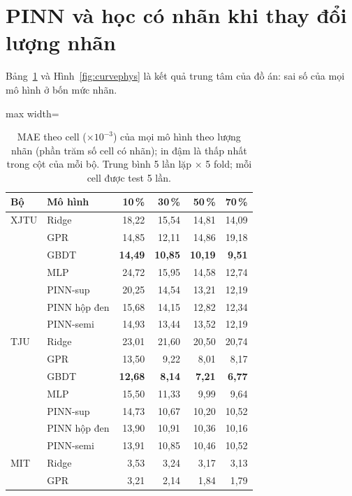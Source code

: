 \documentclass[12pt,a4paper,oneside]{report}
\theoremstyle{plain}
\theoremstyle{definition}
\begin{document}
\section{PINN và học có nhãn khi thay đổi lượng nhãn}\label{sec:labels}

Bảng~\ref{tab:big} và Hình~\ref{fig:curvephys} là kết quả trung tâm của đồ án: sai số của
mọi mô hình ở bốn mức nhãn.

\begin{table}[!htbp]\centering\small
\caption[MAE theo cell của mọi mô hình theo lượng nhãn]{MAE theo cell (×$10^{-3}$) của mọi mô hình theo lượng nhãn (phần trăm số cell có nhãn); in đậm là thấp nhất trong cột của mỗi bộ. Trung bình 5 lần lặp × 5 fold; mỗi cell được test 5 lần.}\label{tab:big}
\begin{adjustbox}{max width=\textwidth}\begin{tabular}{llrrrr}\toprule
Bộ & Mô hình & 10\,\% & 30\,\% & 50\,\% & 70\,\% \\\midrule
XJTU & Ridge & 18{,}22 & 15{,}54 & 14{,}81 & 14{,}09 \\
 & GPR & 14{,}85 & 12{,}11 & 14{,}86 & 19{,}18 \\
 & GBDT & \textbf{14{,}49} & \textbf{10{,}85} & \textbf{10{,}19} & \textbf{9{,}51} \\
 & MLP & 24{,}72 & 15{,}95 & 14{,}58 & 12{,}74 \\
 & PINN-sup & 20{,}25 & 14{,}54 & 13{,}21 & 12{,}19 \\
 & PINN hộp đen & 15{,}68 & 14{,}15 & 12{,}82 & 12{,}34 \\
 & PINN-semi & 14{,}93 & 13{,}44 & 13{,}52 & 12{,}19 \\
\addlinespace[3pt]
TJU & Ridge & 23{,}01 & 21{,}60 & 20{,}50 & 20{,}74 \\
 & GPR & 13{,}50 & 9{,}22 & 8{,}01 & 8{,}17 \\
 & GBDT & \textbf{12{,}68} & \textbf{8{,}14} & \textbf{7{,}21} & \textbf{6{,}77} \\
 & MLP & 15{,}50 & 11{,}33 & 9{,}99 & 9{,}64 \\
 & PINN-sup & 14{,}73 & 10{,}67 & 10{,}20 & 10{,}52 \\
 & PINN hộp đen & 13{,}90 & 10{,}91 & 10{,}36 & 10{,}16 \\
 & PINN-semi & 13{,}91 & 10{,}85 & 10{,}46 & 10{,}52 \\
\addlinespace[3pt]
MIT & Ridge & 3{,}53 & 3{,}24 & 3{,}17 & 3{,}13 \\
 & GPR & 3{,}21 & 2{,}14 & 1{,}84 & 1{,}79 \\

\end{tabular}
\end{adjustbox}
\end{table}
\end{document}
